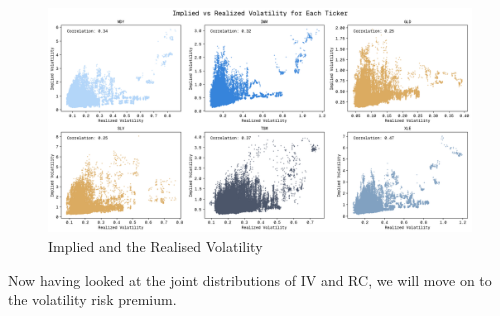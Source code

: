 \begin{figure}[H]
    \centering
    \includegraphics[width=1\textwidth]{images/iv_and_rv_otm_batch2.png}
    \caption{Implied and the Realised Volatility}
    \label{fig:iv_and_rv__otm_2}
\end{figure}

Now having looked at the joint distributions of IV and RC, we will move on to the volatility risk premium.